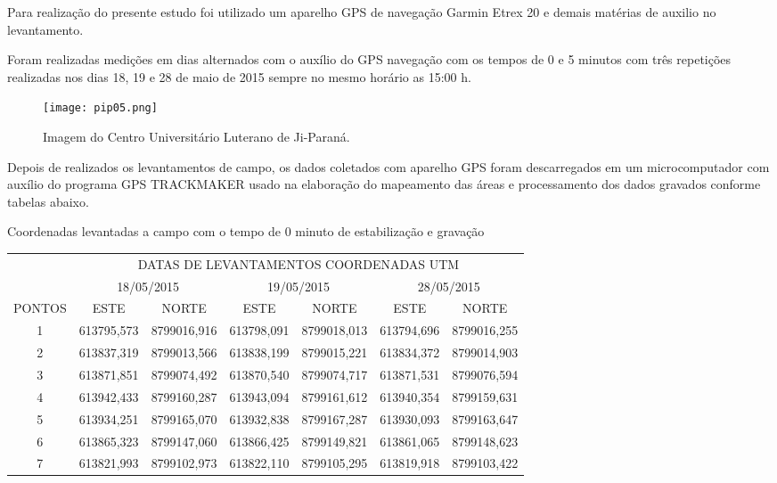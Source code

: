 \documentclass[article,12pt,onesidea,4paper,english,brazil]{abntex2}
\begin{document}
Para realização do presente estudo foi utilizado um aparelho GPS de navegação Garmin Etrex 20 e demais matérias de auxilio no levantamento.

Foram realizadas medições em dias alternados com o auxílio do GPS navegação com os tempos de 0 e 5 minutos com três repetições realizadas nos dias 18, 19 e 28 de maio de 2015 sempre no mesmo horário as 15:00 h.

	\begin{figure}[h]
	\centering
	\texttt{[image: pip05.png]}
	\caption{Imagem do Centro Universitário Luterano de Ji-Paraná.}
\end{figure}

Depois de realizados os levantamentos de campo, os dados coletados com aparelho GPS foram descarregados em um microcomputador com auxílio do programa GPS TRACKMAKER usado na elaboração do mapeamento das áreas e processamento dos dados gravados conforme tabelas abaixo.

\begin{quadro}[h]
	\centering
	\caption{Coordenadas levantadas a campo com o tempo de 0 minuto de estabilização e gravação}
	\label{my-label}
	\begin{tabular}{c|c|c|c|c|c|c|}
		\cline{2-7}
		& \multicolumn{6}{c|}{DATAS DE LEVANTAMENTOS COORDENADAS UTM}                                         \\ \cline{2-7} 
		& \multicolumn{2}{c|}{18/05/2015} & \multicolumn{2}{c|}{19/05/2015} & \multicolumn{2}{c|}{28/05/2015} \\ \hline
		\multicolumn{1}{|c|}{PONTOS} & ESTE           & NORTE          & ESTE           & NORTE          & ESTE           & NORTE          \\ \hline
		\multicolumn{1}{|c|}{1}      & 613795,573     & 8799016,916    & 613798,091     & 8799018,013    & 613794,696     & 8799016,255    \\ \hline
		\multicolumn{1}{|c|}{2}      & 613837,319     & 8799013,566    & 613838,199     & 8799015,221    & 613834,372     & 8799014,903    \\ \hline
		\multicolumn{1}{|c|}{3}      & 613871,851     & 8799074,492    & 613870,540     & 8799074,717    & 613871,531     & 8799076,594    \\ \hline
		\multicolumn{1}{|c|}{4}      & 613942,433     & 8799160,287    & 613943,094     & 8799161,612    & 613940,354     & 8799159,631    \\ \hline
		\multicolumn{1}{|c|}{5}      & 613934,251     & 8799165,070    & 613932,838     & 8799167,287    & 613930,093     & 8799163,647    \\ \hline
		\multicolumn{1}{|c|}{6}      & 613865,323     & 8799147,060    & 613866,425     & 8799149,821    & 613861,065     & 8799148,623    \\ \hline
		\multicolumn{1}{|c|}{7}      & 613821,993     & 8799102,973    & 613822,110     & 8799105,295    & 613819,918     & 8799103,422    \\ \hline
	\end{tabular}
\end{quadro}
\end{document}
